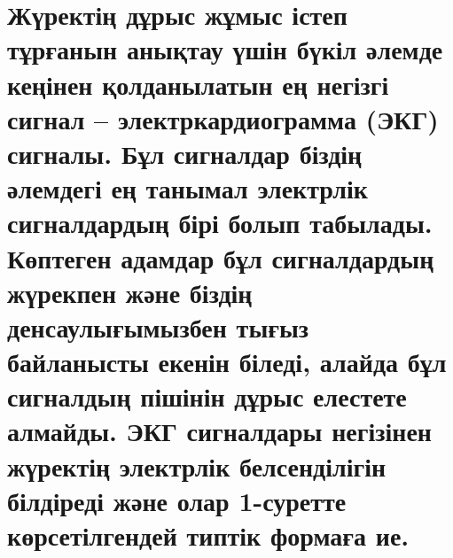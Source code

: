 \documentclass[
]{article}
\begin{document}
\section{Жүректің дұрыс жұмыс істеп тұрғанын анықтау үшін бүкіл әлемде
кеңінен қолданылатын ең негізгі сигнал -- электркардиограмма (ЭКГ)
сигналы. Бұл сигналдар біздің әлемдегі ең танымал электрлік сигналдардың
бірі болып табылады. Көптеген адамдар бұл сигналдардың жүрекпен және
біздің денсаулығымызбен тығыз байланысты екенін біледі, алайда бұл
сигналдың пішінін дұрыс елестете алмайды. ЭКГ сигналдары негізінен
жүректің электрлік белсенділігін білдіреді және олар 1-суретте
көрсетілгендей типтік формаға
ие.}\label{ux436ux4afux440ux435ux43aux442ux456ux4a3-ux434ux4b1ux440ux44bux441-ux436ux4b1ux43cux44bux441-ux456ux441ux442ux435ux43f-ux442ux4b1ux440ux493ux430ux43dux44bux43d-ux430ux43dux44bux49bux442ux430ux443-ux4afux448ux456ux43d-ux431ux4afux43aux456ux43b-ux4d9ux43bux435ux43cux434ux435-ux43aux435ux4a3ux456ux43dux435ux43d-ux49bux43eux43bux434ux430ux43dux44bux43bux430ux442ux44bux43d-ux435ux4a3-ux43dux435ux433ux456ux437ux433ux456-ux441ux438ux433ux43dux430ux43b-ux44dux43bux435ux43aux442ux440ux43aux430ux440ux434ux438ux43eux433ux440ux430ux43cux43cux430-ux44dux43aux433-ux441ux438ux433ux43dux430ux43bux44b.-ux431ux4b1ux43b-ux441ux438ux433ux43dux430ux43bux434ux430ux440-ux431ux456ux437ux434ux456ux4a3-ux4d9ux43bux435ux43cux434ux435ux433ux456-ux435ux4a3-ux442ux430ux43dux44bux43cux430ux43b-ux44dux43bux435ux43aux442ux440ux43bux456ux43a-ux441ux438ux433ux43dux430ux43bux434ux430ux440ux434ux44bux4a3-ux431ux456ux440ux456-ux431ux43eux43bux44bux43f-ux442ux430ux431ux44bux43bux430ux434ux44b.-ux43aux4e9ux43fux442ux435ux433ux435ux43d-ux430ux434ux430ux43cux434ux430ux440-ux431ux4b1ux43b-ux441ux438ux433ux43dux430ux43bux434ux430ux440ux434ux44bux4a3-ux436ux4afux440ux435ux43aux43fux435ux43d-ux436ux4d9ux43dux435-ux431ux456ux437ux434ux456ux4a3-ux434ux435ux43dux441ux430ux443ux43bux44bux493ux44bux43cux44bux437ux431ux435ux43d-ux442ux44bux493ux44bux437-ux431ux430ux439ux43bux430ux43dux44bux441ux442ux44b-ux435ux43aux435ux43dux456ux43d-ux431ux456ux43bux435ux434ux456-ux430ux43bux430ux439ux434ux430-ux431ux4b1ux43b-ux441ux438ux433ux43dux430ux43bux434ux44bux4a3-ux43fux456ux448ux456ux43dux456ux43d-ux434ux4b1ux440ux44bux441-ux435ux43bux435ux441ux442ux435ux442ux435-ux430ux43bux43cux430ux439ux434ux44b.-ux44dux43aux433-ux441ux438ux433ux43dux430ux43bux434ux430ux440ux44b-ux43dux435ux433ux456ux437ux456ux43dux435ux43d-ux436ux4afux440ux435ux43aux442ux456ux4a3-ux44dux43bux435ux43aux442ux440ux43bux456ux43a-ux431ux435ux43bux441ux435ux43dux434ux456ux43bux456ux433ux456ux43d-ux431ux456ux43bux434ux456ux440ux435ux434ux456-ux436ux4d9ux43dux435-ux43eux43bux430ux440-1-ux441ux443ux440ux435ux442ux442ux435-ux43aux4e9ux440ux441ux435ux442ux456ux43bux433ux435ux43dux434ux435ux439-ux442ux438ux43fux442ux456ux43a-ux444ux43eux440ux43cux430ux493ux430-ux438ux435.}
\end{document}
